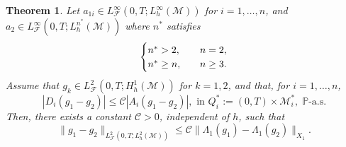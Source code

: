 \documentclass[11pt,oneside,leqno]{amsart}
\numberwithin{equation}{section}
\numberwithin{equation}{section}
\newtheorem{theorem}{Theorem}[section]
\begin{document}
\begin{theorem}\label{firstresulttheorem}
Let $a_{1i}\in L^\infty_{\mathcal{F}}(0,T;L_h^\infty(\mathcal{M}))$ for $i=1,\ldots,n$, and $a_2\in L_{\mathcal{F}}^{\infty}(0,T;L_h^{n^{\ast}}(\mathcal{M}))$ where $n^{\ast}$ satisfies
\begin{equation}\label{conditionofn^{ast}}
\begin{cases}
    n^{\ast}>2,&\quad n=2,\\
    n^{\ast}\geq n,&\quad n\geq 3.
\end{cases}    
\end{equation}
Assume that $g_k \in L^2_{\mathcal{F}}(0,T;H_h^1(\mathcal{M}))$ for $k=1,2$, and that, for $i=1,\ldots,n$,
\begin{equation}\label{conditionong}
|D_i(g_1 - g_2)| \leq \mathcal{C}|A_i(g_1 - g_2)|,  \text{ in } { Q_i^*:=(0,T)\times\mathcal{M}_{i}^{\ast}}, \; \mathbb{P}\text{-a.s.}
\end{equation}
Then, there exists a constant $\mathcal{C} > 0$, independent of $h$, such that
\begin{equation}\label{eq:firstresult}
\|g_1 - g_2\|_{L^2_{\mathcal{F}}(0,T;L_h^2(\mathcal{M}))} \leq \mathcal{C} \|\Lambda_1(g_1) - \Lambda_1(g_2)\|_{X_1}.
\end{equation}
\end{theorem}
\end{document}
